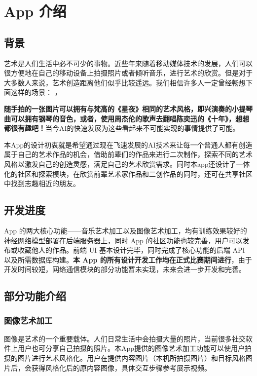 \section{App 介绍}

\subsection{背景}

艺术是人们生活中必不可少的事物。近些年来随着移动媒体技术的发展，人们可以很方便地在自己的移动设备上拍摄照片或者倾听音乐，进行艺术的欣赏。但是对于大多数人来说，艺术创造距离他们似乎比较遥远。我们相信许多人一定曾经畅想下面这样的场景：
，

\textbf{随手拍的一张图片可以拥有与梵高的《星夜》相同的艺术风格，即兴演奏的小提琴曲可以拥有钢琴的音色，或者，使用周杰伦的歌声去翻唱陈奕迅的《十年》，想想都很有趣吧！}当今AI的快速发展为这些看起来不可能实现的事情提供了可能。

本App的设计初衷就是希望通过现在飞速发展的AI技术来让每一个普通人都有创造属于自己的艺术作品的机会，借助前辈们的作品来进行二次制作，探索不同的艺术风格以激发自己的创造灵感，满足自己的艺术欣赏需求。同时本app还设计了一体化的社区和探索模块，在欣赏前辈艺术家作品和二创作品的同时，还可在共享社区中找到志趣相近的朋友。

\subsection{开发进度}

App 的两大核心功能——音乐艺术加工以及图像艺术加工，均有训练效果较好的神经网络模型部署在后端服务器上，同时 App 的社区功能也较完善，用户可以发布或收藏他人的作品。前端 UI 基本设计完毕，同时完成了核心功能的后端 API 以及所需数据库构建。\textbf{本 App 的所有设计开发工作均在正式比赛期间进行}，由于开发时间较短，网络通信模块的部分功能暂未实现，未来会进一步开发和完善。

\subsection{部分功能介绍}

\subsubsection{图像艺术加工}

图像是艺术的一个重要载体。人们日常生活中会拍摄大量的照片，当前很多社交软件上用户也可分享自己拍摄的照片。本App提供的图像艺术加工功能可以使用户拍摄的图片进行艺术风格化。用户在提供内容图片（本机所拍摄图片）和目标风格图片后，会获得风格化后的原内容图像，具体交互步骤参考展示视频。

